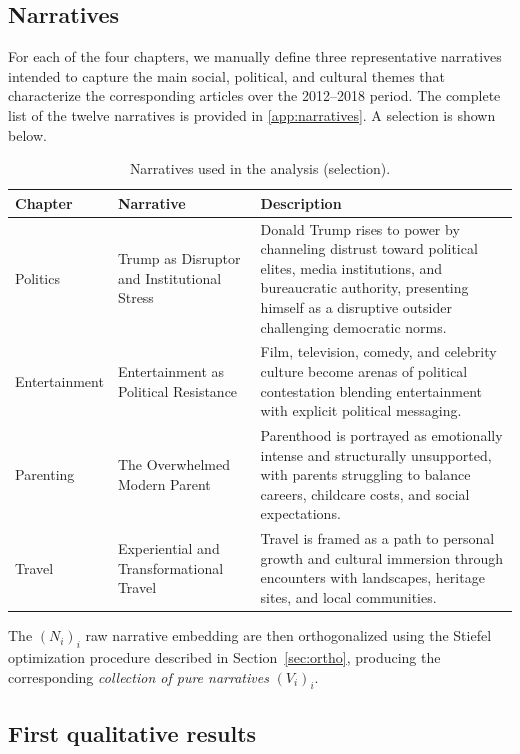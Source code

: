 \documentclass[
  journal=medium,
  manuscript=article-type,
  year=2025,
  volume=1,
]{cup-journal}
\begin{document}
\subsection{Narratives}

For each of the four chapters, we manually define three representative narratives intended to capture the main social, political, and cultural themes that characterize the corresponding articles over the 2012--2018 period. The complete list of the twelve narratives is provided in \ref{app:narratives}. A selection is shown below.

\begin{table}[hbt!]
\begin{threeparttable}
\caption{Narratives used in the analysis (selection).}
\label{tab:narratives_short}
\begin{tabular}{llp{6cm}}
\toprule
\headrow Chapter & Narrative & Description \\
\midrule
Politics
  & Trump as Disruptor and Institutional Stress
  & Donald Trump rises to power by channeling distrust toward political elites,
    media institutions, and bureaucratic authority, presenting himself as a
    disruptive outsider challenging democratic norms. \\
\addlinespace
Entertainment
  & Entertainment as Political Resistance
  & Film, television, comedy, and celebrity culture become arenas of political
    contestation blending entertainment with explicit political messaging. \\
\addlinespace
Parenting
  & The Overwhelmed Modern Parent
  & Parenthood is portrayed as emotionally intense and structurally unsupported,
    with parents struggling to balance careers, childcare costs, and social
    expectations. \\
\addlinespace
Travel
  & Experiential and Transformational Travel
  & Travel is framed as a path to personal growth and cultural immersion through
    encounters with landscapes, heritage sites, and local communities. \\
\bottomrule
\end{tabular}
\end{threeparttable}
\end{table}

The $(N_i)_i$ raw narrative embedding are then orthogonalized using the Stiefel optimization procedure described in Section~\ref{sec:ortho}, producing the corresponding \textit{collection of pure narratives} $(V_i)_i$.

\subsection{First qualitative results}
\label{sec:application:qualitative}
\end{document}
